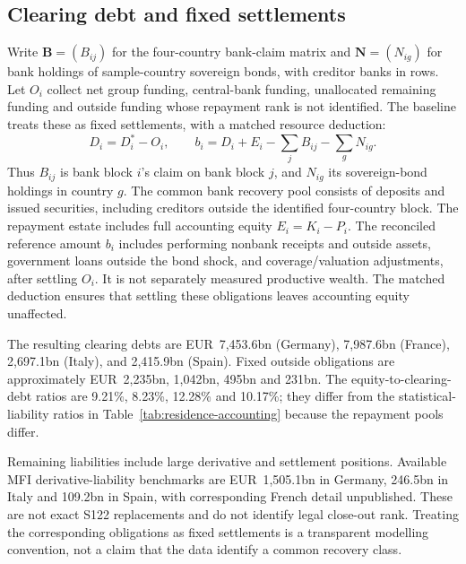 \subsection{Clearing debt and fixed settlements}

Write $\mathbf{B}=(B_{ij})$ for the four-country bank-claim matrix and $\mathbf{N}=(N_{ig})$ for bank holdings of sample-country sovereign bonds, with creditor banks in rows. Let $O_i$ collect net group funding, central-bank funding, unallocated remaining funding and outside funding whose repayment rank is not identified. The baseline treats these as fixed settlements, with a matched resource deduction:
\[
 D_i=D_i^*-O_i,\qquad
 b_i=D_i+E_i-\sum_j B_{ij}-\sum_gN_{ig}.
\]
Thus $B_{ij}$ is bank block $i$'s claim on bank block $j$, and $N_{ig}$ its sovereign-bond holdings in country $g$. The common bank recovery pool consists of deposits and issued securities, including creditors outside the identified four-country block. The repayment estate includes full accounting equity $E_i=K_i-P_i$. The reconciled reference amount $b_i$ includes performing nonbank receipts and outside assets, government loans outside the bond shock, and coverage/valuation adjustments, after settling $O_i$. It is not separately measured productive wealth. The matched deduction ensures that settling these obligations leaves accounting equity unaffected.

The resulting clearing debts are EUR~7,453.6bn (Germany), 7,987.6bn (France), 2,697.1bn (Italy), and 2,415.9bn (Spain). Fixed outside obligations are approximately EUR~2,235bn, 1,042bn, 495bn and 231bn. The equity-to-clearing-debt ratios are 9.21\%, 8.23\%, 12.28\% and 10.17\%; they differ from the statistical-liability ratios in Table~\ref{tab:residence-accounting} because the repayment pools differ.

Remaining liabilities include large derivative and settlement positions. Available MFI derivative-liability benchmarks are EUR~1,505.1bn in Germany, 246.5bn in Italy and 109.2bn in Spain, with corresponding French detail unpublished. These are not exact S122 replacements and do not identify legal close-out rank. Treating the corresponding obligations as fixed settlements is a transparent modelling convention, not a claim that the data identify a common recovery class.


